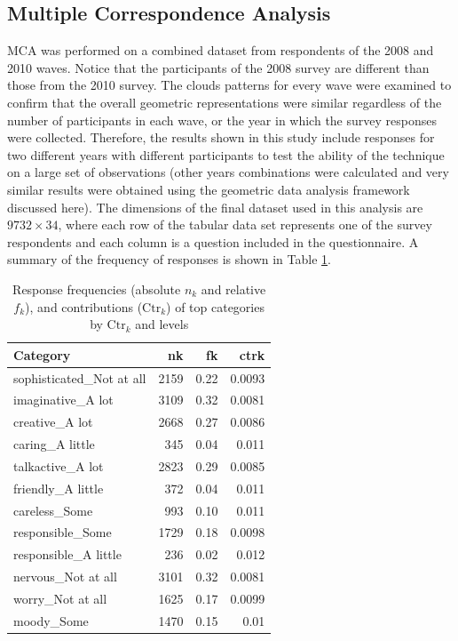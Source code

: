 \documentclass[conference,final,]{IEEEtran}
\begin{document}
\hypertarget{multiple-correspondence-analysis}{%
\subsection{Multiple Correspondence
Analysis}\label{multiple-correspondence-analysis}}

MCA was performed on a combined dataset from respondents of the 2008 and
2010 waves. Notice that the participants of the 2008 survey are
different than those from the 2010 survey. The clouds patterns for every
wave were examined to confirm that the overall geometric representations
were similar regardless of the number of participants in each wave, or
the year in which the survey responses were collected. Therefore, the
results shown in this study include responses for two different years
with different participants to test the ability of the technique on a
large set of observations (other years combinations were calculated and
very similar results were obtained using the geometric data analysis
framework discussed here). The dimensions of the final dataset used in
this analysis are \(9732 \times 34\), where each row of the tabular data
set represents one of the survey respondents and each column is a
question included in the questionnaire. A summary of the frequency of
responses is shown in Table \ref{tab:fknkTop12}.

\begin{table}[H]
\caption{Response frequencies (absolute $n_k$ and relative $f_k$), and contributions ($\text{Ctr}_k$) of  top categories by $\text{Ctr}_k$ and levels} 
\centering
\begin{tabular}{lrrr}
  \hline
  Category & nk & fk & ctrk \\ 
  \hline
  sophisticated\_Not at all & 2159 & 0.22 & 0.0093 \\ 
  imaginative\_A lot & 3109 & 0.32 & 0.0081 \\ 
  creative\_A lot & 2668 & 0.27 & 0.0086 \\ 
  caring\_A little & 345 & 0.04 & 0.011 \\ 
  talkactive\_A lot & 2823 & 0.29 & 0.0085 \\ 
  friendly\_A little & 372 & 0.04 & 0.011 \\ 
  careless\_Some & 993 & 0.10 & 0.011 \\ 
  responsible\_Some & 1729 & 0.18 & 0.0098 \\ 
  responsible\_A little & 236 & 0.02 & 0.012 \\ 
  nervous\_Not at all & 3101 & 0.32 & 0.0081 \\ 
  worry\_Not at all & 1625 & 0.17 & 0.0099 \\ 
  moody\_Some & 1470 & 0.15 & 0.01 \\ 
   \hline
\end{tabular}
\label{tab:fknkTop12}
\end{table}
\end{document}
